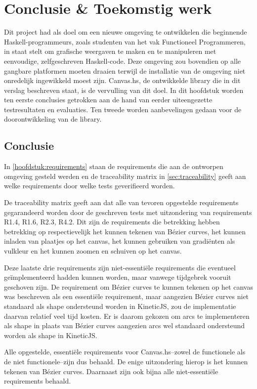 \chapter{Conclusie \& Toekomstig werk} \label{hoofdstuk:conclusie}
Dit project had als doel om een nieuwe omgeving te ontwikkelen die beginnende Haskell-programmeurs, zoals studenten van het vak Functioneel Programmeren, in staat stelt om grafische weergaven te maken en te manipuleren met eenvoudige, zelfgeschreven Haskell-code. Deze omgeving zou bovendien op alle gangbare platformen moeten draaien terwijl de installatie van de omgeving niet onredelijk ingewikkeld moest zijn. Canvas.hs, de ontwikkelde library die in dit verslag beschreven staat, is de vervulling van dit doel. In dit hoofdstuk worden ten eerste conclusies getrokken aan de hand van eerder uiteengezette testresultaten en evaluaties. Ten tweede worden aanbevelingen gedaan voor de doorontwikkeling van de library.

\section{Conclusie} \label{sec:conclusie}
In \autoref{hoofdstuk:requirements} staan de requirements die aan de ontworpen omgeving gesteld werden en de traceability matrix in \autoref{sec:traceability} geeft aan welke requirements door welke tests geverifieerd worden.

De traceability matrix geeft aan dat alle van tevoren opgestelde requirements gegarandeerd worden door de geschreven tests met uitzondering van requirements R1.4, R1.6, R2.3, R4.2. Dit zijn de requirements die betrekking hebben betrekking op respectievelijk het kunnen tekenen van Bézier curves, het kunnen inladen van plaatjes op het canvas, het kunnen gebruiken van gradiënten als vulkleur en het kunnen zoomen en schuiven op het canvas.

Deze laatste drie requirements zijn niet-essentiële requirements die eventueel geïmplementeerd hadden kunnen worden, maar vanwege tijdgebrek vooruit geschoven zijn. De requirement om Bézier curves te kunnen tekenen op het canvas was beschreven als een essentiële requirement, maar aangezien Bézier curves niet standaard als shape ondersteund worden in KineticJS, zou de implementatie daarvan relatief veel tijd kosten. Er is daarom gekozen om arcs te implementeren als shape in plaats van Bézier curves aangezien arcs wel standaard ondersteund worden als shape in KineticJS.

Alle opgestelde, essentiële requirements voor Canvas.hs--zowel de functionele als de niet functionele--zijn dus behaald. De enige uitzondering hierop is het kunnen tekenen van Bézier curves. Daarnaast zijn ook bijna alle niet-essentiële requirements behaald.

